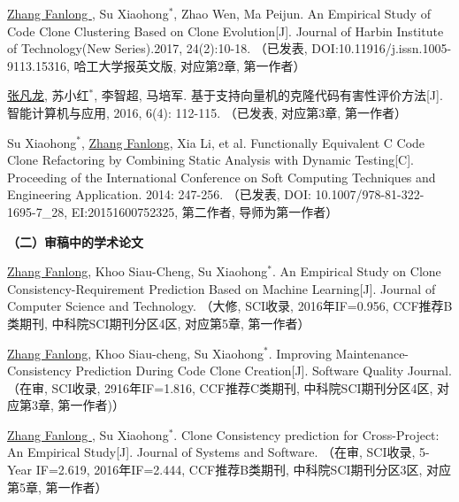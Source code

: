 \begin{publist}
\item
\underline{Zhang Fanlong }, Su Xiaohong{$^*$},  Zhao Wen,  Ma Peijun. An Empirical Study of Code Clone Clustering Based on Clone Evolution[J]. Journal of Harbin Institute of Technology(New Series).2017, 24(2):10-18.
（已发表, DOI:10.11916/j.issn.1005-9113.15316, 哈工大学报英文版, 对应第2章, 第一作者）

\item
\underline{张凡龙}, 苏小红{$^*$},  李智超,  马培军. 基于支持向量机的克隆代码有害性评价方法[J]. 智能计算机与应用, 2016, 6(4): 112-115. 
（已发表, 对应第3章, 第一作者）

\item
Su Xiaohong{$^*$}, \underline{Zhang Fanlong},  Xia Li, et al. Functionally Equivalent C Code Clone Refactoring by Combining Static Analysis with Dynamic Testing[C]. Proceeding of the International Conference on Soft Computing Techniques and Engineering Application. 2014: 247-256.
（已发表, DOI: 10.1007/978-81-322-1695-7\_28, EI:20151600752325, 第二作者, 导师为第一作者）
\end{publist}

\newpage
\noindent\textbf{（二）审稿中的学术论文}
\begin{publist}

\item
\underline{Zhang Fanlong},  Khoo Siau-Cheng, Su Xiaohong{$^*$}. An Empirical Study on Clone Consistency-Requirement Prediction Based on Machine Learning[J]. Journal of Computer Science and Technology.
（大修, SCI收录, 2016年IF=0.956, CCF推荐B类期刊, 中科院SCI期刊分区4区, 对应第5章, 第一作者）

\item
\underline{Zhang Fanlong}, Khoo Siau-cheng, Su Xiaohong{$^*$}. Improving Maintenance-Consistency Prediction During Code Clone Creation[J]. Software Quality Journal. 
（在审, SCI收录, 2916年IF=1.816, CCF推荐C类期刊, 中科院SCI期刊分区4区, 对应第3章, 第一作者)）

\item
\underline{Zhang Fanlong }, Su Xiaohong{$^*$}. Clone Consistency prediction for Cross-Project: An Empirical Study[J]. Journal of Systems and Software.
（在审, SCI收录, 5-Year IF=2.619, 2016年IF=2.444, CCF推荐B类期刊, 中科院SCI期刊分区3区, 对应第5章, 第一作者）



\end{publist}

